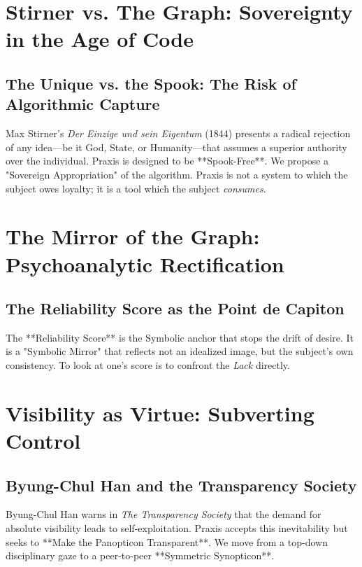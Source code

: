 \documentclass[12pt,a4paper,oneside]{report}
\begin{document}
\chapter{Stirner vs. The Graph: Sovereignty in the Age of Code}

\section{The Unique vs. the Spook: The Risk of Algorithmic Capture}
Max Stirner’s \textit{Der Einzige und sein Eigentum} (1844) presents a radical rejection of any idea—be it God, State, or Humanity—that assumes a superior authority over the individual. Praxis is designed to be **Spook-Free**. We propose a "Sovereign Appropriation" of the algorithm. Praxis is not a system to which the subject owes loyalty; it is a tool which the subject \textit{consumes}. 

\chapter{The Mirror of the Graph: Psychoanalytic Rectification}

\section{The Reliability Score as the Point de Capiton}
The **Reliability Score** is the Symbolic anchor that stops the drift of desire. It is a "Symbolic Mirror" that reflects not an idealized image, but the subject's own consistency. To look at one's score is to confront the \textit{Lack} directly. 

\chapter{Visibility as Virtue: Subverting Control}

\section{Byung-Chul Han and the Transparency Society}
Byung-Chul Han warns in \textit{The Transparency Society} that the demand for absolute visibility leads to self-exploitation. Praxis accepts this inevitability but seeks to **Make the Panopticon Transparent**. We move from a top-down disciplinary gaze to a peer-to-peer **Symmetric Synopticon**.
\end{document}
